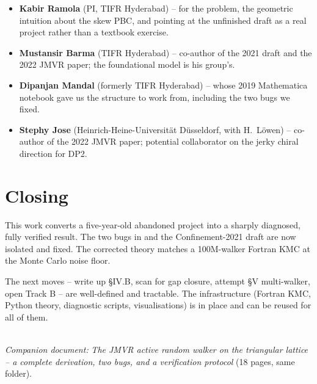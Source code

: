 \documentclass[11pt,a4paper]{article}
\begin{document}
\begin{itemize}[leftmargin=*,nosep]
\item \textbf{Kabir Ramola} (PI, TIFR Hyderabad) -- for the problem,
  the geometric intuition about the skew PBC, and pointing at the
  unfinished draft as a real project rather than a textbook exercise.
\item \textbf{Mustansir Barma} (TIFR Hyderabad) -- co-author of the
  2021 draft and the 2022 JMVR paper; the foundational model is his
  group's.
\item \textbf{Dipanjan Mandal} (formerly TIFR Hyderabad) -- whose 2019
  Mathematica notebook gave us the structure to work from, including
  the two bugs we fixed.
\item \textbf{Stephy Jose} (Heinrich-Heine-Universität Düsseldorf,
  with H.~Löwen) -- co-author of the 2022 JMVR paper; potential
  collaborator on the jerky chiral direction for DP2.
\end{itemize}

\section{Closing}\label{sec:closing}

This work converts a five-year-old abandoned project into a sharply
diagnosed, fully verified result. The two bugs in
{} and the Confinement-2021 draft are now isolated
and fixed. The corrected theory matches a 100M-walker Fortran KMC at the
Monte Carlo noise floor.

The next moves -- write up §IV.B, scan for gap closure, attempt §V
multi-walker, open Track B -- are well-defined and tractable. The
infrastructure (Fortran KMC, Python theory, diagnostic scripts,
visualisations) is in place and can be reused for all of them.

\vspace{1cm}
\noindent\hrulefill\\[2mm]
\footnotesize\noindent
\textit{Companion document:} \emph{The JMVR active random walker on the
triangular lattice -- a complete derivation, two bugs, and a
verification protocol} (18 pages, same folder).
\end{document}

